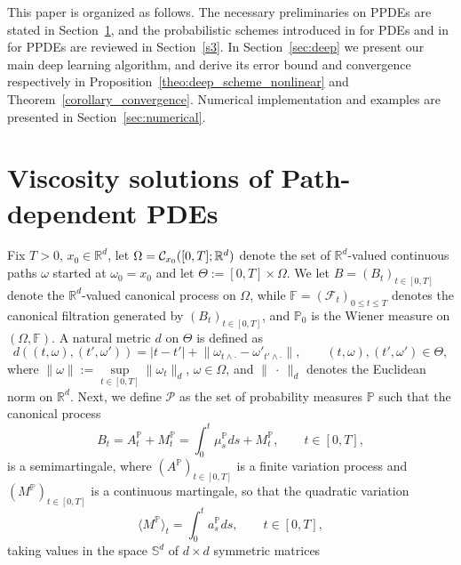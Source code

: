 \documentclass[12pt]{article}
\numberwithin{equation}{section}
\newcommand{\abs}[1]{\lvert#1\rvert}
\newcommand{\norm}[1]{\lVert#1\rVert}
\def\P{{\mathord{\mathbb P}}}
\newcommand{\real}{\mathbb{R}}
\let\oldcitet=\citet
\renewcommand{\cite}[1]{\textcolor[rgb]{0,0,1}{\oldcitet{#1}}}
\renewcommand{\citet}[1]{\textcolor[rgb]{0,0,1}{\oldcitet{#1}}}
\begin{document}
This paper is organized as follows.
The necessary preliminaries on PPDEs are stated in Section~\ref{sec:ppde},
and the probabilistic schemes
introduced in \cite{fahim}
for PDEs and in \cite{ren2017convergence}
for PPDEs are reviewed in Section~\ref{s3}.
In Section~\ref{sec:deep}
we present our main deep learning algorithm, and
derive its error bound and convergence respectively in
Proposition~\ref{theo:deep_scheme_nonlinear}
and Theorem~\ref{corollary_convergence}.
Numerical implementation and examples are presented
in Section~\ref{sec:numerical}.

\section{Viscosity solutions of Path-dependent PDEs} %
\label{sec:ppde}
 Fix $T > 0$, $x_0 \in \real^d$,
 let $\Omega = {\cal C}_{x_0} ([0,T]; \real^d)$
 denote the set
 of $\real^d$-valued continuous paths $\omega$ started at $\omega_0 = x_0$
and let $\Theta := [0,T] \times \Omega$.
We let $B=(B_t)_{t\in [0,T]}$
denote the $\real^d$-valued canonical process on $\Omega$,
while $\mathbb{F} = ( \mathcal{F}_t )_{0 \leq t \leq T}$
denotes the canonical filtration
generated by $(B_t)_{t\in [0,T]}$, and
$\P_0$ is the Wiener measure on $( \Omega , \mathbb{F} )$.
A natural metric $d$ on $\Theta$ is defined as
\begin{equation*}
	d\left( (t,\omega), (t', \omega') \right) =
	\abs{t-t'} + \norm{ \omega_{t\land\cdot} - \omega'_{t'\land\cdot} },
 \qquad (t,\omega),(t',\omega') \in \Theta,
\end{equation*}
where
$\displaystyle \norm{\omega} := \sup\limits_{t \in [0,T]} \norm{\omega_t}_d$,
$\omega \in \Omega$, and
  $\norm{\ \! \cdot \ \! }_d$ denotes the Euclidean norm on
$\real^d$.
Next, we define $\mathcal{P}$ as the set of
probability measures $\mathbb{P}$ such that
the canonical process
$$ B_t = A^\mathbb{P}_t + M^\mathbb{P}_t
= \int_0^t \mu^\mathbb{P}_s ds + M^\mathbb{P}_t, \qquad t\in [0,T],
$$
is a semimartingale,
where $(A^\mathbb{P})_{t\in [0,T]}$ is a finite variation process
and $(M^\mathbb{P})_{t\in [0,T]}$ is a continuous martingale,
so that the quadratic variation
$$
\langle M^\mathbb{P} \rangle_t = \int_0^t a^\mathbb{P}_s ds, \qquad t\in [0,T],
$$
 taking values in the space $\mathbb{S}^d$ of $d \times d$ symmetric matrices
\end{document}
